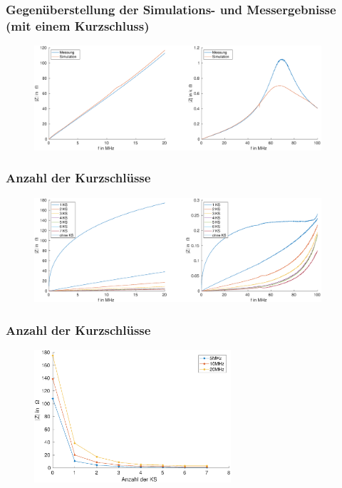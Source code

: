 \documentclass[accentcolor=tud9b, colorbacktitle, inverttitle]{tudbeamer}
\begin{document}
\begin{frame}\frametitle{Gegen\"uberstellung der Simulations- und Messergebnisse (mit einem Kurzschluss)}
\vspace{-1em}
\begin{figure}[h]
	\centering
	\includegraphics[width=0.95\textwidth]{Z_ges_1KS_SimMeas}
\end{figure}
\end{frame}





\begin{frame}\frametitle{Anzahl der Kurzschl\"usse}
\vspace{-1em}
\begin{figure}[h]
	\centering
	\includegraphics[width=0.95\textwidth]{impedance_numberKS_ringcore}
\end{figure}
\end{frame}


\begin{frame}\frametitle{Anzahl der Kurzschl\"usse}
 \vspace{-1em}
\begin{figure}[h]
	\centering
	\includegraphics[width=0.65\textwidth]{RK_Impedanz_numberKS_frequenz}
\end{figure}
\end{frame}
\end{document}
